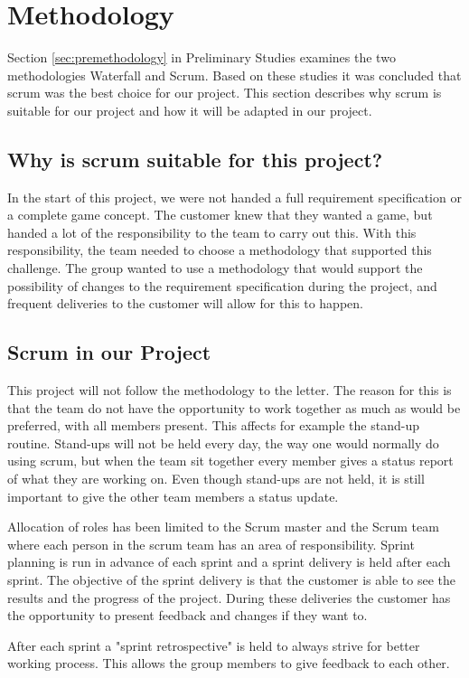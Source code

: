 \section{Methodology}

    Section \ref{sec:premethodology} in Preliminary Studies examines the two methodologies Waterfall and Scrum. Based on 
    these studies it was concluded that scrum was the best choice for our project. This section 
    describes why scrum is suitable for our project and how it will be adapted in our project.

\subsection*{Why is scrum suitable for this project?}

    In the start of this project, we were not handed a full requirement specification 
    or a complete game concept. The customer knew that they wanted a game, but handed a 
    lot of the responsibility to the team to carry out this. With this responsibility, 
    the team needed to choose a methodology that supported this challenge. The group 
    wanted to use a methodology that would support the possibility of changes to the 
    requirement specification during the project, and frequent deliveries to the customer 
    will allow for this to happen. 

\subsection*{Scrum in our Project}

    This project will not follow the methodology to the letter. The reason for this is 
    that the team do not have the opportunity to work together as much as would be 
    preferred, with all members present. This affects for example the stand-up routine. 
    Stand-ups will not be held every day, the way one would normally do using scrum, but when the 
    team sit together every member gives a status report of what they are working on. 
    Even though stand-ups are not held, it is still important to give the other team 
    members a status update.

    Allocation of roles has been limited to the Scrum master and the Scrum team where 
    each person in the scrum team has an area of responsibility. Sprint planning is run 
    in advance of each sprint and a sprint delivery is held after each sprint. The 
    objective of the sprint delivery is that the customer is able to see the results 
    and the progress of the project. During these deliveries the customer has the 
    opportunity to present feedback and changes if they want to.

    After each sprint a "sprint retrospective" is held to always strive for better working 
    process. This allows the group members to give feedback to each other.

